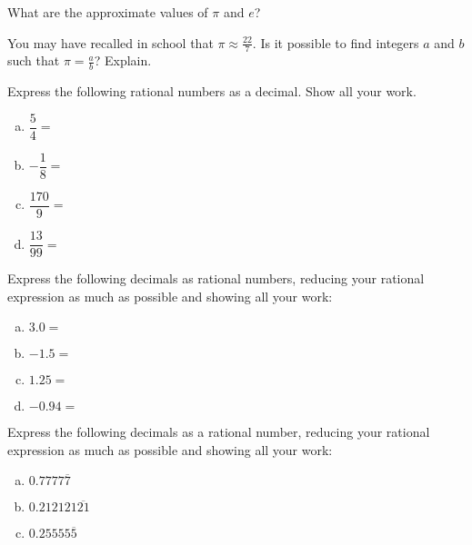 \documentclass[11pt,letterpaper]{article}
\begin{document}

 What are the approximate values of $\pi$ and $e$?



\vspace{3cm}



 You may have recalled in school that $\pi \approx \frac{22}{7}$. Is it possible to find integers $a$ and $b$ such that $\pi= \frac{a}{b}$? Explain. 



\vspace{4cm}



 Express the following rational numbers as a decimal. Show all your work. \pspace
\begin{enumerate}[(a)]
\item $\dfrac{5}{4}=$ \vfill
\item $-\dfrac{1}{8}=$ \vfill
\item $\dfrac{170}{9}=$ \vfill
\item $\dfrac{13}{99}=$ \vfill
\end{enumerate}



\newpage



 Express the following decimals as rational numbers, reducing your rational expression as much as possible and showing all your work: \pspace
\begin{enumerate}[(a)]
\item $3.0=$ \pvspace{1cm}
\item $-1.5=$ \pvspace{1cm}
\item $1.25=$ \pvspace{1cm}
\item $-0.94=$ \pvspace{1cm}
\end{enumerate}


 Express the following decimals as a rational number, reducing your rational expression as much as possible and showing all your work:
\begin{enumerate}[(a)]
\item $0.7777\overline{7}$ \vfill
\item $0.212121\overline{21}$ \vfill
\item $0.25555\overline{5}$ \vfill
\end{enumerate}
\end{document}
